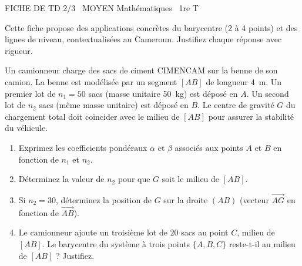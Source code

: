 \documentclass[11pt]{article}
\begin{document}
\begin{tcolorbox}[enhanced,colback=popink,colframe=popink,arc=10pt,boxrule=0pt,left=12pt,right=12pt,top=9pt,bottom=9pt]
{\color{white}\popxbold\small FICHE DE TD 2/3 \textbullet\ MOYEN \hfill Mathématiques \textbullet\ 1re T\par}
\end{tcolorbox}
\vspace{4pt}
Cette fiche propose des applications concrètes du barycentre (2 à 4 points) et des lignes de niveau, contextualisées au Cameroun. Justifiez chaque réponse avec rigueur.

\begin{exercice}
Un camionneur charge des sacs de ciment CIMENCAM sur la benne de son camion. La benne est modélisée par un segment $[AB]$ de longueur \SI{4}{\meter}. Un premier lot de $n_1 = 50$ sacs (masse unitaire \SI{50}{\kilogram}) est déposé en $A$. Un second lot de $n_2$ sacs (même masse unitaire) est déposé en $B$. Le centre de gravité $G$ du chargement total doit coïncider avec le milieu de $[AB]$ pour assurer la stabilité du véhicule.
\begin{enumerate}
    \item Exprimez les coefficients pondéraux $\alpha$ et $\beta$ associés aux points $A$ et $B$ en fonction de $n_1$ et $n_2$.
    \item Déterminez la valeur de $n_2$ pour que $G$ soit le milieu de $[AB]$.
    \item Si $n_2 = 30$, déterminez la position de $G$ sur la droite $(AB)$ (vecteur $\overrightarrow{AG}$ en fonction de $\overrightarrow{AB}$).
    \item Le camionneur ajoute un troisième lot de $20$ sacs au point $C$, milieu de $[AB]$. Le barycentre du système à trois points $\{A, B, C\}$ reste-t-il au milieu de $[AB]$ ? Justifiez.
\end{enumerate}
\end{exercice}
\end{document}
